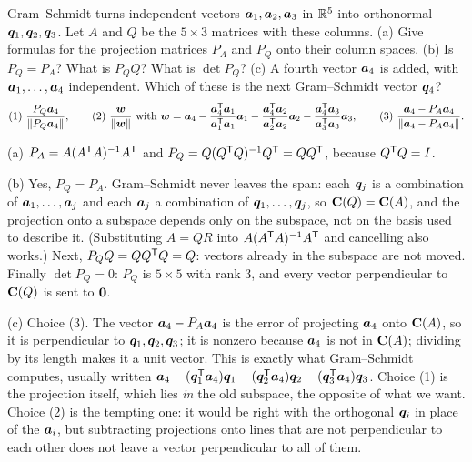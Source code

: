 \begin{example}\label{ex:u28-gs}
Gram--Schmidt turns independent vectors $\boldsymbol{a}_1,\boldsymbol{a}_2,\boldsymbol{a}_3$ in $\mathbb{R}^{5}$ into
orthonormal $\boldsymbol{q}_1,\boldsymbol{q}_2,\boldsymbol{q}_3$. Let $A$ and $Q$ be the $5\times3$ matrices with
these columns. (a) Give formulas for the projection matrices $P_A$ and $P_Q$ onto their
column spaces. (b) Is $P_Q=P_A$? What is $P_QQ$? What is $\det P_Q$? (c) A fourth vector
$\boldsymbol{a}_4$ is added, with $\boldsymbol{a}_1,\dots,\boldsymbol{a}_4$ independent. Which of these is the next
Gram--Schmidt vector $\boldsymbol{q}_4$?
\[
  \text{(1)}\ \frac{P_Q\vb{a}_4}{\|P_Q\vb{a}_4\|},\qquad
  \text{(2)}\ \frac{\vb{w}}{\|\vb{w}\|}\ \text{with}\
  \vb{w}=\vb{a}_4-\frac{\vb{a}_4\T\vb{a}_1}{\vb{a}_1\T\vb{a}_1}\vb{a}_1
  -\frac{\vb{a}_4\T\vb{a}_2}{\vb{a}_2\T\vb{a}_2}\vb{a}_2
  -\frac{\vb{a}_4\T\vb{a}_3}{\vb{a}_3\T\vb{a}_3}\vb{a}_3,\qquad
  \text{(3)}\ \frac{\vb{a}_4-P_A\vb{a}_4}{\|\vb{a}_4-P_A\vb{a}_4\|}.
\]

(a) $P_A=A(A^{\mathsf{T}} A)^{-1}A^{\mathsf{T}}$ and $P_Q=Q(Q^{\mathsf{T}} Q)^{-1}Q^{\mathsf{T}}=QQ^{\mathsf{T}}$, because $Q^{\mathsf{T}} Q=I$.

(b) Yes, $P_Q=P_A$. Gram--Schmidt never leaves the span: each $\boldsymbol{q}_j$ is a combination
of $\boldsymbol{a}_1,\dots,\boldsymbol{a}_j$ and each $\boldsymbol{a}_j$ a combination of $\boldsymbol{q}_1,\dots,\boldsymbol{q}_j$,
so $\mathbf{C}(Q)=\mathbf{C}(A)$, and the projection onto a subspace depends only on the subspace, not on
the basis used to describe it. (Substituting $A=QR$ into $A(A^{\mathsf{T}} A)^{-1}A^{\mathsf{T}}$ and cancelling
also works.) Next, $P_QQ=QQ^{\mathsf{T}} Q=Q$: vectors already in the subspace are not moved. Finally
$\det P_Q=0$: $P_Q$ is $5\times5$ with rank $3$, and every vector perpendicular to $\mathbf{C}(Q)$ is
sent to $\boldsymbol{0}$.

(c) Choice (3). The vector $\boldsymbol{a}_4-P_A\boldsymbol{a}_4$ is the error of projecting $\boldsymbol{a}_4$ onto
$\mathbf{C}(A)$, so it is perpendicular to $\boldsymbol{q}_1,\boldsymbol{q}_2,\boldsymbol{q}_3$; it is nonzero because
$\boldsymbol{a}_4$ is not in $\mathbf{C}(A)$; dividing by its length makes it a unit vector. This is
exactly what Gram--Schmidt computes, usually written
$\boldsymbol{a}_4-(\boldsymbol{q}_1^{\mathsf{T}}\boldsymbol{a}_4)\boldsymbol{q}_1-(\boldsymbol{q}_2^{\mathsf{T}}\boldsymbol{a}_4)\boldsymbol{q}_2-(\boldsymbol{q}_3^{\mathsf{T}}\boldsymbol{a}_4)\boldsymbol{q}_3$.
Choice (1) is the projection itself, which lies \emph{in} the old subspace, the opposite of
what we want. Choice (2) is the tempting one: it would be right with the orthogonal
$\boldsymbol{q}_i$ in place of the $\boldsymbol{a}_i$, but subtracting projections onto lines that are not
perpendicular to each other does not leave a vector perpendicular to all of them.
\end{example}

